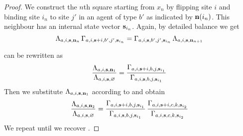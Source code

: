 \begin{proof}
  We construct the $n$th square
  starting from $x_n$ by flipping site $i$
  and binding site $i_n$ to site $j'$ in an agent of type $b'$
  as indicated by $\boldsymbol{\mathbf{n}}(i_n)$.
  This neighbour has an internal state vector $\boldsymbol{\mathbf{s}}_{i_n}$.
  Again, by detailed balance we get
  \begin{equation}
    \label{eq:fbn}
    \Lambda_{a,i,\boldsymbol{\mathbf{s}},\boldsymbol{\mathbf{n}}_n} \,
    \Gamma_{a,i,\boldsymbol{\mathbf{s}}+i,b',j',\boldsymbol{\mathbf{s}}_{i_n}} =
    \Gamma_{a,i,\boldsymbol{\mathbf{s}},b',j',\boldsymbol{\mathbf{s}}_{i_n}} \,
    \Lambda_{a,i,\boldsymbol{\mathbf{s}},\boldsymbol{\mathbf{n}}_{n+1}}
  \end{equation}

   can be rewritten as
  \begin{equation*}
    \frac{
      \Lambda_{a,i,\boldsymbol{\mathbf{s}},\boldsymbol{\mathbf{n}}_1}}{
      \Lambda_{a,i,\boldsymbol{\mathbf{s}},\varnothing}} =
    \frac{
      \Gamma_{a,i,\boldsymbol{\mathbf{s}}+i,
              b,j,\boldsymbol{\mathbf{s}}_{i_1}}}{
      \Gamma_{a,i,\boldsymbol{\mathbf{s}},
              b,j,\boldsymbol{\mathbf{s}}_{i_1}}}
  \end{equation*}
  Then we substitute $\Lambda_{a,i,\boldsymbol{\mathbf{s}},\boldsymbol{\mathbf{n}}_1}$
  according to  and obtain
  \begin{equation*}
    \frac{
      \Lambda_{a,i,\boldsymbol{\mathbf{s}},\boldsymbol{\mathbf{n}}_2}}{
      \Lambda_{a,i,\boldsymbol{\mathbf{s}},\varnothing}} =
    \frac{
      \Gamma_{a,i,\boldsymbol{\mathbf{s}}+i,
              b,j,\boldsymbol{\mathbf{s}}_{i_1}}}{
      \Gamma_{a,i,\boldsymbol{\mathbf{s}},
              b,j,\boldsymbol{\mathbf{s}}_{i_1}}} \,
    \frac{
      \Gamma_{a,i,\boldsymbol{\mathbf{s}}+i,
              c,k,\boldsymbol{\mathbf{s}}_{i_2}}}{
      \Gamma_{a,i,\boldsymbol{\mathbf{s}},
              c,k,\boldsymbol{\mathbf{s}}_{i_2}}}
  \end{equation*}
  We repeat until we recover .
\end{proof}





